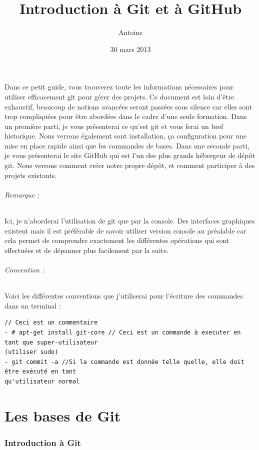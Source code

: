 \documentclass[a4paper]{article}
\title{Introduction à Git et à GitHub}
\author{Antoine \bsc{Wacheux}}
\date{30 mars 2013}
\begin{document}
\maketitle

Dans ce petit guide, vous trouverez toute les informations nécessaires pour utiliser efficacement git pour gérer des projets. Ce document est loin d'être exhaustif, beaucoup de notions avancées seront passées sous silence car elles sont trop compliquées pour être abordées dans le cadre d'une seule formation. Dans un première parti, je vous présenterai ce qu'est git et vous ferai un bref historique. Nous verrons également sont installation, ça configuration pour une mise en place rapide ainsi que les commandes de bases. Dans une seconde parti, je vous présenterai le site GitHub qui est l'un des plus grands hébergeur de dépôt git. Nous verrons comment créer notre propre dépôt, et comment participer à des projets existants.

\paragraph{Remarque :} Ici, je n'aborderai l'utilisation de git que par la console. Des interfaces graphiques existent mais il est préférable de savoir utiliser version console au préalable car cela permet de comprendre exactement les différentes opérations qui sont effectuées et de dépanner plus facilement par la suite. 

\paragraph{Convention :} Voici les différentes conventions que j'utiliserai pour l'écriture des commandes dans un terminal : 

\begin{verbatim}
// Ceci est un commentaire
- # apt-get install git-core // Ceci est un commande à executer en tant que super-utilisateur 
(utiliser sudo)
- git commit -a //Si la commande est donnée telle quelle, elle doit être exécuté en tant 
qu'utilisateur normal
\end{verbatim}

\tableofcontents

\part{Les bases de Git}

\section{Introduction à Git}
\end{document}
